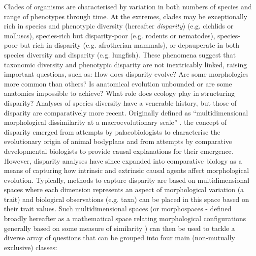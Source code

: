 \documentclass[12pt,letterpaper]{article}
\begin{document}
\noindent Clades of organisms are characterised by variation in both numbers of species and range of phenotypes through time.
At the extremes, clades may be exceptionally rich in species and phenotypic diversity (hereafter \textit{disparity}) (e.g. cichlids or molluscs), species-rich but disparity-poor (e.g. rodents or nematodes), species-poor but rich in disparity (e.g. afrotherian mammals), or depauperate in both species diversity and disparity (e.g. lungfish).
These phenomena suggest that taxonomic diversity and phenotypic disparity are not inextricably linked, raising important questions, such as: How does disparity evolve? Are some morphologies more common than others? Is anatomical evolution unbounded or are some anatomies impossible to achieve? What role does ecology play in structuring disparity? Analyses of species diversity have a venerable history, but those of disparity are comparatively more recent.
Originally defined as ``multidimensional morphological dissimilarity at a macroevolutionary scale'' \citep{runnegar1987rates,Gould1991}, the concept of disparity emerged from attempts by palaeobiologists to characterise the evolutionary origin of animal bodyplans and from attempts by comparative developmental biologists to provide causal explanations for their emergence.
However, disparity analyses have since expanded into comparative biology as a means of capturing how intrinsic and extrinsic causal agents affect morphological evolution.
Typically, methods to capture disparity are based on multidimensional spaces where each dimension represents an aspect of morphological variation (a trait) and biological observations (e.g. taxa) can be placed in this space based on their trait values.
Such multidimensional spaces (or morphospaces - defined broadly hereafter as a mathematical space relating morphological configurations generally based on some measure of similarity \citep{mitteroecker2009concept}) can then be used to tackle a diverse array of questions that can be grouped into four main (non-mutually exclusive) classes: %
\end{document}
